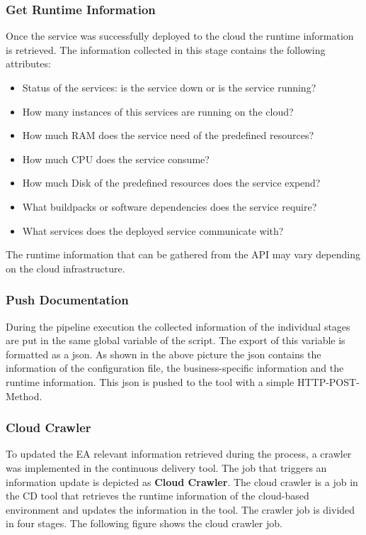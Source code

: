 \subsubsection{Get Runtime Information}
Once the service was successfully deployed to the cloud the runtime information is retrieved. The information collected in this stage contains the following attributes:

\begin{itemize}
    \item Status of the services: is the service down or is the service running?
    \item How many instances of this services are running on the cloud?
    \item How much RAM does the service need of the predefined resources?
    \item How much CPU does the service consume?
    \item How much Disk of the predefined resources does the service expend?
    \item What buildpacks or software dependencies does the service require?
    \item What services does the deployed service communicate with?
\end{itemize}

The runtime information that can be gathered from the API may vary depending on the cloud infrastructure.

\subsubsection{Push Documentation}
During the pipeline execution the collected information of the individual stages are put in the same global variable of the script. The export of this variable is formatted as a json. As shown in the above picture the json contains the information of the configuration file, the business-specific information and the runtime information. This json is pushed to the tool with a simple HTTP-POST-Method.

\subsubsection{Cloud Crawler}\label{subsubsection:cloudcrawler}
To updated the EA relevant information retrieved during the process, a crawler was implemented in the continuous delivery tool. The job that triggers an information update is depicted as \textbf{Cloud Crawler}. The cloud crawler is a job in the CD tool that retrieves the runtime information of the cloud-based environment and updates the information in the tool. The crawler job is divided in four stages. The following figure shows the cloud crawler job.

